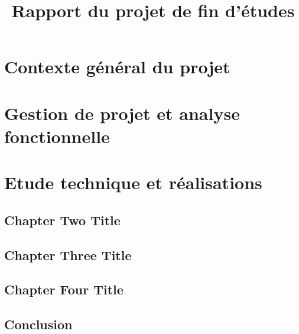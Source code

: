 \documentclass[a4paper, french, 12pt]{report}
\title{Rapport du projet de fin d'études}\let\title\@title
\begin{document}
\begin{titlepage}
  
\end{titlepage}


\ClearShipoutPicture
\newpage









\tableofcontents
\listoftables
\listoffigures



\fancyhead{}
\fancyfoot{}
\fancyfoot[LE,RO]{\thepage}


\part{Contexte général du projet}

\part{Gestion de projet et analyse fonctionnelle}

\part{Etude technique et réalisations}



\chapter{Chapter Two Title}


\chapter{Chapter Three Title}


\chapter{Chapter Four Title}


\chapter{Conclusion}

\end{document}
